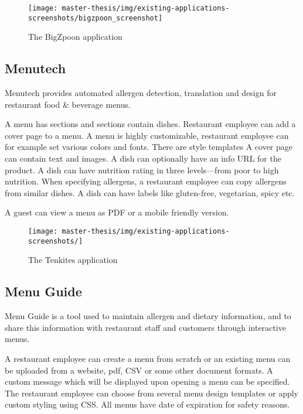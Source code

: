   \begin{figure}[h]
    \centering
    \texttt{[image: master-thesis/img/existing-applications-screenshots/bigzpoon\_screenshot]}
    \caption{The BigZpoon application}
  \end{figure}

\newpage

\subsection*{Menutech}
  Menutech provides automated allergen detection, translation and design for restaurant food & beverage menus.
  
  A menu has sections and sections contain dishes.
  Restaurant employee can add a cover page to a menu.
  A menu is highly customizable, restaurant employee can for example set various colors and fonts.
  There are style templates
  A cover page can contain text and images.
  A dish can optionally have an info URL for the product.
  A dish can have nutrition rating in three levels---from poor to high nutrition.
  When specifying allergens, a restaurant employee can copy allergens from similar dishes.
  A dish can have labels like gluten-free, vegetarian, spicy etc.

  A guest can view a menu as PDF or a mobile friendly version.

  \begin{figure}[h]
    \centering
    \texttt{[image: master-thesis/img/existing-applications-screenshots/]}
    \caption{The Tenkites application}
  \end{figure}

\subsection*{Menu Guide}
  Menu Guide is a tool used to maintain allergen and dietary information, and to share this information with restaurant staff and customers through interactive menus.

  A restaurant employee can create a menu from scratch or an existing menu can be uploaded from a website, pdf, CSV or some other document formats. 
  A custom message which will be displayed upon opening a menu can be specified.
  The restaurant employee can choose from several menu design templates or apply custom styling using CSS.
  All menus have date of expiration for safety reasons.

